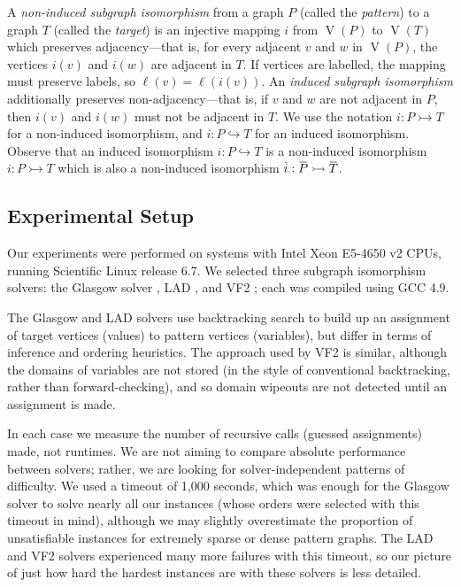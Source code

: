 \documentclass[twoside,11pt]{article}
\newcommand{\citep}[1]{\cite{#1}}
\newcommand{\shortoverline}[1]{\mkern 1.5mu\overline{\mkern-1.5mu#1\mkern-1.5mu}\mkern 1.5mu}
\begin{document}
A \emph{non-induced subgraph isomorphism} from a graph $P$ (called the \emph{pattern}) to a graph
$T$ (called the \emph{target}) is an injective mapping $i$ from $\operatorname{V}(P)$ to
$\operatorname{V}(T)$ which preserves adjacency---that is, for every adjacent $v$ and $w$ in
$\operatorname{V}(P)$, the vertices $i(v)$ and $i(w)$ are adjacent in $T$. If vertices are labelled,
the mapping must preserve labels, so $\ell(v) = \ell(i(v))$. An \emph{induced subgraph isomorphism}
additionally preserves non-adjacency---that is, if $v$ and $w$ are not adjacent in $P$, then $i(v)$
and $i(w)$ must not be adjacent in $T$. We use the notation $i : P \rightarrowtail T$ for a
non-induced isomorphism, and $i : P \hookrightarrow T$ for an induced isomorphism. Observe that an
induced isomorphism $i : P \hookrightarrow T$ is a non-induced isomorphism $i : P \rightarrowtail T$
which is also a non-induced isomorphism $\shortoverline{i} : \shortoverline{P} \rightarrowtail
\shortoverline{T}$.

\subsection{Experimental Setup}

Our experiments were performed on systems with Intel Xeon E5-4650 v2 CPUs, running Scientific Linux
release 6.7. We selected three subgraph isomorphism solvers: the Glasgow solver
\citep{McCreesh:2015}, LAD \citep{Solnon:2010}, and VF2 \citep{Cordella:2004}; each was compiled
using GCC 4.9.

The Glasgow and LAD solvers use backtracking search to build up an assignment of target vertices
(values) to pattern vertices (variables), but differ in terms of inference and ordering heuristics.
The approach used by VF2 is similar, although the domains of variables are not stored (in the style
of conventional backtracking, rather than forward-checking), and so domain wipeouts are not detected
until an assignment is made.

In each case we measure the number of recursive calls (guessed assignments) made, not runtimes. We
are not aiming to compare absolute performance between solvers; rather, we are looking for
solver-independent patterns of difficulty. We used a timeout of 1,000 seconds, which was enough for
the Glasgow solver to solve nearly all our instances (whose orders were selected with this timeout
in mind), although we may slightly overestimate the proportion of unsatisfiable instances for
extremely sparse or dense pattern graphs. The LAD and VF2 solvers experienced many more failures
with this timeout, so our picture of just how hard the hardest instances are with these solvers is
less detailed.
\end{document}
